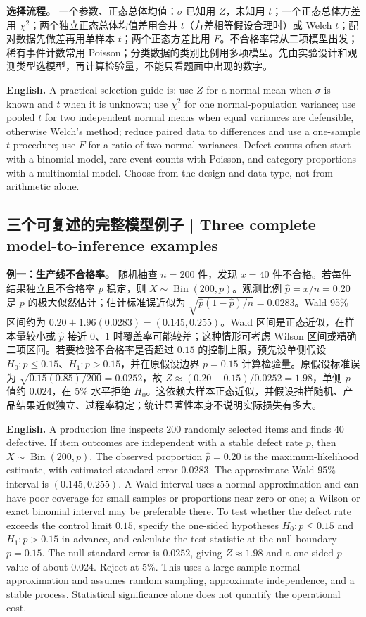 \documentclass[UTF8,11pt,a4paper]{ctexart}
\newcommand{\EN}[1]{\par\noindent\textbf{English.} #1\par}
\begin{document}
\noindent\textbf{选择流程。} 一个参数、正态总体均值：$\sigma$ 已知用 $Z$，未知用 $t$；一个正态总体方差用 $\chi^2$；两个独立正态总体均值差用合并 $t$（方差相等假设合理时）或 Welch $t$；配对数据先做差再用单样本 $t$；两个正态方差比用 $F$。不合格率常从二项模型出发；稀有事件计数常用 Poisson；分类数据的类别比例用多项模型。先由实验设计和观测类型选模型，再计算检验量，不能只看题面中出现的数字。
\EN{A practical selection guide is: use $Z$ for a normal mean when $\sigma$ is known and $t$ when it is unknown; use $\chi^2$ for one normal-population variance; use pooled $t$ for two independent normal means when equal variances are defensible, otherwise Welch's method; reduce paired data to differences and use a one-sample $t$ procedure; use $F$ for a ratio of two normal variances. Defect counts often start with a binomial model, rare event counts with Poisson, and category proportions with a multinomial model. Choose from the design and data type, not from arithmetic alone.}

\subsection{三个可复述的完整模型例子 | Three complete model-to-inference examples}
\noindent\textbf{例一：生产线不合格率。} 随机抽查 $n=200$ 件，发现 $x=40$ 件不合格。若每件结果独立且不合格率 $p$ 稳定，则 $X\sim\operatorname{Bin}(200,p)$。观测比例 $\hat p=x/n=0.20$ 是 $p$ 的极大似然估计；估计标准误近似为 $\sqrt{\hat p(1-\hat p)/n}=0.0283$。Wald 95\% 区间约为 $0.20\pm1.96(0.0283)=(0.145,0.255)$。Wald 区间是正态近似，在样本量较小或 $\hat p$ 接近 $0$、$1$ 时覆盖率可能较差；这种情形可考虑 Wilson 区间或精确二项区间。若要检验不合格率是否超过 $0.15$ 的控制上限，预先设单侧假设 $H_0:p\le0.15$、$H_1:p>0.15$，并在原假设边界 $p=0.15$ 计算检验量。原假设标准误为 $\sqrt{0.15(0.85)/200}=0.0252$，故 $Z\approx(0.20-0.15)/0.0252=1.98$，单侧 $p$ 值约 $0.024$，在 $5\%$ 水平拒绝 $H_0$。这依赖大样本正态近似，并假设抽样随机、产品结果近似独立、过程率稳定；统计显著性本身不说明实际损失有多大。
\EN{A production line inspects $200$ randomly selected items and finds $40$ defective. If item outcomes are independent with a stable defect rate $p$, then $X\sim\operatorname{Bin}(200,p)$. The observed proportion $\hat p=0.20$ is the maximum-likelihood estimate, with estimated standard error $0.0283$. The approximate Wald 95\% interval is $(0.145,0.255)$. A Wald interval uses a normal approximation and can have poor coverage for small samples or proportions near zero or one; a Wilson or exact binomial interval may be preferable there. To test whether the defect rate exceeds the control limit $0.15$, specify the one-sided hypotheses $H_0:p\le0.15$ and $H_1:p>0.15$ in advance, and calculate the test statistic at the null boundary $p=0.15$. The null standard error is $0.0252$, giving $Z\approx1.98$ and a one-sided $p$-value of about $0.024$. Reject at 5\%. This uses a large-sample normal approximation and assumes random sampling, approximate independence, and a stable process. Statistical significance alone does not quantify the operational cost.}
\end{document}
